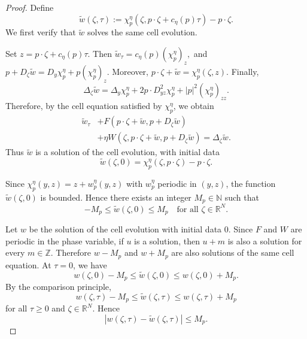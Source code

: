 \documentclass[preprint]{elsarticle}
\numberwithin{equation}{section}
\begin{document}
\begin{proof}
Define
\begin{equation*}
\widetilde w(\zeta,\tau)
:=
\chi_p^\eta\left(\zeta,p\cdot\zeta+c_\eta(p)\tau\right)
-
p\cdot\zeta.
\end{equation*}
We first verify that $\widetilde w$ solves the same cell evolution.

Set $z=p\cdot\zeta+c_\eta(p)\tau.$
Then $\widetilde w_\tau
=
c_\eta(p)(\chi_p^\eta)_z,$
and $p+D_\zeta\widetilde w
=
D_y\chi_p^\eta+p(\chi_p^\eta)_z.$
Moreover, $p\cdot\zeta+\widetilde w
=
\chi_p^\eta(\zeta,z).$
Finally,
\[
\Delta_\zeta \widetilde w
=
\Delta_y\chi_p^\eta
+
2p\cdot D^2_{yz}\chi_p^\eta
+
|p|^2(\chi_p^\eta)_{zz}.
\]
Therefore, by the cell equation satisfied by $\chi_p^\eta$, we obtain
\[
\begin{aligned}
\widetilde w_\tau
&+
F\left(p\cdot \zeta+\widetilde w,p+D_\zeta\widetilde w\right)
\\
&+
\eta W\left(\zeta,p\cdot \zeta+\widetilde w,p+D_\zeta\widetilde w\right)
=
\Delta_\zeta \widetilde w.
\end{aligned}
\]
Thus $\widetilde w$ is a solution of the cell evolution, with initial data
\begin{equation*}
\widetilde w(\zeta,0)
=
\chi_p^\eta(\zeta,p\cdot\zeta)-p\cdot\zeta.
\end{equation*}

Since $\chi_p^\eta(y,z)=z+w_p^\eta(y,z)$
with $w_p^\eta$ periodic in $(y,z)$, the function $\widetilde w(\zeta,0)$ is bounded. Hence there exists an integer $M_p\in\mathbb N$ such that
\begin{equation*}
-M_p\le \widetilde w(\zeta,0)\le M_p
\quad\text{for all }\zeta\in\mathbb R^N.
\end{equation*}

Let $w$ be the solution of the cell evolution with initial data $0$. Since $F$ and $W$ are periodic in the phase variable, if $u$ is a solution, then $u+m$ is also a solution for every $m\in\mathbb Z$. Therefore $w-M_p$ and $w+M_p$ are also solutions of the same cell equation. At $\tau=0$, we have
\[
w(\zeta,0)-M_p
\le
\widetilde w(\zeta,0)
\le
w(\zeta,0)+M_p.
\]
By the comparison principle,
\begin{equation*}
w(\zeta,\tau)-M_p
\le
\widetilde w(\zeta,\tau)
\le
w(\zeta,\tau)+M_p
\end{equation*}
for all $\tau\ge0$ and $\zeta\in\mathbb R^N$. Hence
\begin{equation*}
|w(\zeta,\tau)-\widetilde w(\zeta,\tau)|\le M_p. \label{4.48}
\end{equation*}


\end{proof}
\end{document}
